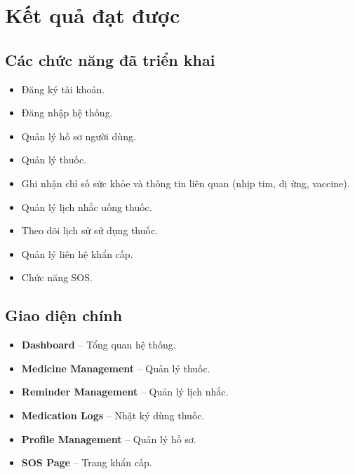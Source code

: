 \documentclass[12pt,a4paper]{report}
\begin{document}
\chapter{Kết quả đạt được}

\section{Các chức năng đã triển khai}

\begin{itemize}[leftmargin=1.5em, itemsep=2pt]
  \item Đăng ký tài khoản.
  \item Đăng nhập hệ thống.
  \item Quản lý hồ sơ người dùng.
  \item Quản lý thuốc.
  \item Ghi nhận chỉ số sức khỏe và thông tin liên quan (nhịp tim, dị ứng, vaccine).
  \item Quản lý lịch nhắc uống thuốc.
  \item Theo dõi lịch sử sử dụng thuốc.
  \item Quản lý liên hệ khẩn cấp.
  \item Chức năng SOS.
\end{itemize}

\section{Giao diện chính}

\begin{itemize}[leftmargin=1.5em, itemsep=2pt]
  \item \textbf{Dashboard} -- Tổng quan hệ thống.
  \item \textbf{Medicine Management} -- Quản lý thuốc.
  \item \textbf{Reminder Management} -- Quản lý lịch nhắc.
  \item \textbf{Medication Logs} -- Nhật ký dùng thuốc.
  \item \textbf{Profile Management} -- Quản lý hồ sơ.
  \item \textbf{SOS Page} -- Trang khẩn cấp.
\end{itemize}

\end{document}
